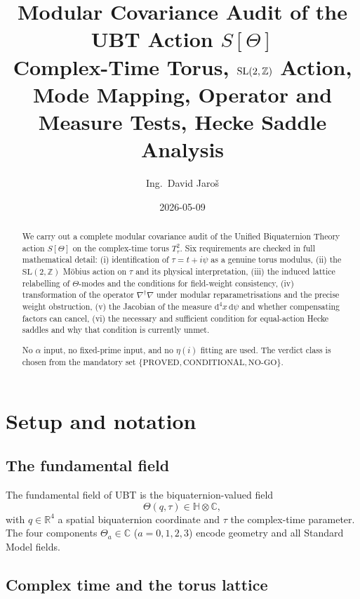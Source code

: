 \documentclass[12pt,a4paper]{article}
\title{\textbf{Modular Covariance Audit of the UBT Action $S[\Theta]$}\\[6pt]
\large Complex-Time Torus, $\SL(2,\ZZ)$ Action,\\
Mode Mapping, Operator and Measure Tests, Hecke Saddle Analysis}
\author{Ing.\ David Jaro\v{s}}
\date{2026-05-09}
\theoremstyle{definition}
\theoremstyle{remark}
\newcommand{\SL}{\mathrm{SL}}
\newcommand{\ZZ}{\mathbb{Z}}
\newcommand{\RR}{\mathbb{R}}
\newcommand{\CC}{\mathbb{C}}
\newcommand{\dd}{\mathrm{d}}
\begin{document}
\maketitle

\begin{abstract}
We carry out a complete modular covariance audit of the Unified Biquaternion
Theory action $S[\Theta]$ on the complex-time torus $T^2_\tau$.  Six
requirements are checked in full mathematical detail: (i) identification of
$\tau=t+i\psi$ as a genuine torus modulus, (ii) the $\SL(2,\ZZ)$ Möbius
action on $\tau$ and its physical interpretation, (iii) the induced lattice
relabelling of $\Theta$-modes and the conditions for field-weight consistency,
(iv) transformation of the operator $\nabla^\dagger\nabla$ under modular
reparametrisations and the precise weight obstruction, (v) the Jacobian of the
measure $\dd^4x\,\dd\psi$ and whether compensating factors can cancel,
(vi) the necessary and sufficient condition for equal-action Hecke saddles and
why that condition is currently unmet.

No $\alpha$ input, no fixed-prime input, and no $\eta(i)$ fitting are used.
The verdict class is chosen from the mandatory set
$\{\text{PROVED},\text{CONDITIONAL},\text{NO-GO}\}$.
\end{abstract}

\tableofcontents
\newpage

\section{Setup and notation}
\label{sec:setup}

\subsection{The fundamental field}

The fundamental field of UBT is the biquaternion-valued field
\begin{equation}
  \Theta(q,\tau)\in\mathbb{H}\otimes\CC,
\end{equation}
with $q\in\RR^4$ a spatial biquaternion coordinate and $\tau$ the complex-time
parameter.  The four components $\Theta_a\in\CC$ ($a=0,1,2,3$) encode
geometry and all Standard Model fields.

\subsection{Complex time and the torus lattice}
\label{sec:setup:tau}
\end{document}
